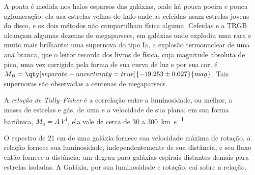 A ponta é medida nos halos esparsos das galáxias, onde há pouca poeira e pouca
aglomeração; ela usa estrelas velhas do halo onde as cefeidas usam estrelas
jovens do disco, e os dois métodos não compartilham física alguma. Cefeidas e a
TRGB alcançam algumas dezenas de megaparsecs, em galáxias onde explodiu uma
 rara e muito mais brilhante: uma supernova do tipo Ia, a explosão
termonuclear de uma anã branca, que o leitor recorda dos livros de física,
cuja magnitude absoluta de pico, uma vez corrigida pela
forma de sua curva de luz e por sua cor, é
$M_B = \qty[separate-uncertainty=true]{-19.253 \pm 0.027}{mag}$. Tais
supernovas são observadas a centenas de megaparsecs.

\begin{definition}\label{def:b3:milky-way-galaxies:tully-fisher}
A \emph{relação de Tully--Fisher} é a
correlação entre a luminosidade, ou melhor, a massa de estrelas e gás,
de uma  e a velocidade de sua  plana; em sua
forma bariônica, $M_\mathrm{b} = A\,V^4$, ela vale de cerca de 30 a
\qty{300}{km.s^{-1}}.
\end{definition}

O espectro de 21 cm de uma galáxia fornece sua velocidade máxima de rotação, a
relação fornece sua luminosidade, independentemente de sua distância, e seu
fluxo então fornece a distância: um degrau para galáxias espirais distantes demais para
estrelas isoladas. A Galáxia, por sua luminosidade e rotação, cai sobre a relação.

